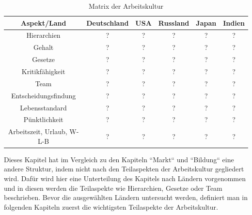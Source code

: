 \begin{table}[htp]
\begin{tabular}{|c|c|c|c|c|c|}
\hline  Aspekt/Land& Deutschland & USA & Russland & Japan & Indien \\ 
\hline 	Hierarchien  & ? & ? & ? & ? & ? \\ 
\hline  Gehalt& ? & ? & ? & ? & ? \\ 
\hline  Gesetze& ? & ? & ? & ? & ?  \\ 
\hline  Kritikfähigkeit& ? & ? & ? & ? & ? \\ 
\hline  Team& ? & ? & ? & ? & ?\\ 
\hline  Entscheidungsfindung& ? & ? & ? & ? & ?  \\ 
\hline  Lebensstandard& ? & ? & ? & ? & ? \\ 
\hline  Pünktlichkeit& ? & ? & ? & ? & ?\\ 
\hline  Arbeitszeit, Urlaub, W-L-B& ? & ? & ? & ? & ?\\ 
\hline 
\end{tabular} 
\caption{Matrix der Arbeitskultur}
\end{table}
%
Dieses Kapitel hat im Vergleich zu den Kapiteln ``Markt`` und ``Bildung`` eine andere Struktur, indem nicht nach den Teilaspekten der Arbeitskultur gegliedert wird. Dafür wird hier eine Unterteilung des Kapitels nach Ländern vorgenommen und in diesen werden die Teilaspekte wie Hierarchien, Gesetze oder Team beschrieben.
Bevor die ausgewählten Ländern untersucht werden, definiert man in folgenden Kapiteln zuerst die wichtigsten Teilaspekte der Arbeitskultur.

